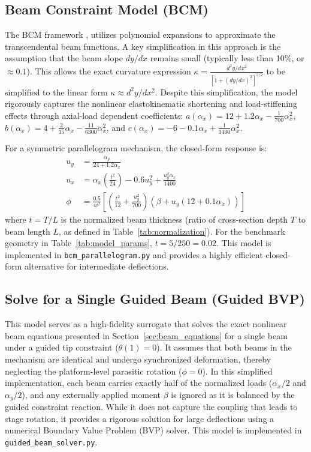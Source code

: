 \documentclass[colorlinks,upint,subscriptcorrection,varvw,hyphenate,balance]{asmeconf} %
\begin{document}
\subsection{Beam Constraint Model (BCM)}
\label{sec:bcm}
The BCM framework \cite{awtar2007characteristics}, utilizes polynomial expansions to approximate the transcendental beam functions. A key simplification in this approach is the assumption that the beam slope $dy/dx$ remains small (typically less than 10\%, or $\approx 0.1$). This allows the exact curvature expression $\kappa = \frac{d^2y/dx^2}{[1 + (dy/dx)^2]^{3/2}}$ to be simplified to the linear form $\kappa \approx d^2y/dx^2$. Despite this simplification, the model rigorously captures the nonlinear elastokinematic shortening and load-stiffening effects through axial-load dependent coefficients: $a(\alpha_x) = 12 + 1.2 \alpha_x - \frac{1}{700} \alpha_x^2$, $b(\alpha_x) = 4 + \frac{2}{15} \alpha_x - \frac{11}{6300} \alpha_x^2$, and $c(\alpha_x) = -6 - 0.1 \alpha_x + \frac{1}{1400} \alpha_x^2$.

For a symmetric parallelogram mechanism, the closed-form response is:
\begin{align}
u_y &= \frac{\alpha_y}{24 + 1.2 \alpha_x} \label{eq:bcm_uy} \\
u_x &= \alpha_x \left( \frac{t^2}{24} \right) - 0.6 u_y^2 + \frac{u_y^2 \alpha_x}{1400} \label{eq:bcm_ux} \\
\phi &= \frac{0.5}{w^2} \left[ \left( \frac{t^2}{12} + \frac{u_y^2}{700} \right) \left( \beta + u_y (12 + 0.1 \alpha_x) \right) \right] \label{eq:bcm_phi}
\end{align}
where $t = T/L$ is the normalized beam thickness (ratio of cross-section depth $T$ to beam length $L$, as defined in Table~\ref{tab:normalization}). For the benchmark geometry in Table~\ref{tab:model_params}, $t = 5/250 = 0.02$. This model is implemented in \texttt{bcm\_parallelogram.py} and provides a highly efficient closed-form alternative for intermediate deflections.

\subsection{Solve for a Single Guided Beam (Guided BVP)}
\label{sec:guided}
This model serves as a high-fidelity surrogate that solves the exact nonlinear beam equations presented in Section~\ref{sec:beam_equations} for a single beam under a guided tip constraint ($\theta(1)=0$). It assumes that both beams in the mechanism are identical and undergo synchronized deformation, thereby neglecting the platform-level parasitic rotation ($\phi = 0$). In this simplified implementation, each beam carries exactly half of the normalized loads ($\alpha_x/2$ and $\alpha_y/2$), and any externally applied moment $\beta$ is ignored as it is balanced by the guided constraint reaction. While it does not capture the coupling that leads to stage rotation, it provides a rigorous solution for large deflections using a numerical Boundary Value Problem (BVP) solver. This model is implemented in \texttt{guided\_beam\_solver.py}.
\end{document}
